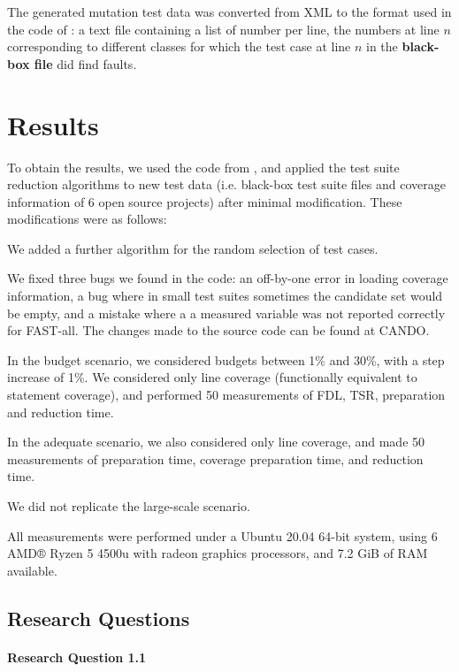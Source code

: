 The generated mutation test data was converted from XML to the format used
in the code of \cite{cruciani2019scalable}: a text file containing a list
of number per line, the numbers at line $n$ corresponding to different
classes for which the test case at line $n$ in the \textbf{black-box file}
did find faults.

\section{Results}

To obtain the results, we used the code from \cite{cruciani2019scalable},
and applied the test suite reduction algorithms to new test data
(i.e. black-box test suite files and coverage information of 6 open source
projects) after minimal modification. These modifications were as follows:

We added a further algorithm for the random selection of test cases.

We fixed three bugs we found in the code: an off-by-one error in loading
coverage information, a bug where in small test suites sometimes the
candidate set would be empty, and a mistake where a a measured variable
was not reported correctly for FAST-all. The changes made to the source
code can be found at CANDO.

In the budget scenario, we considered budgets between 1\% and 30\%, with
a step increase of 1\%. We considered only line coverage (functionally
equivalent to statement coverage), and performed 50 measurements of
FDL, TSR, preparation and reduction time.

In the adequate scenario, we also considered only line coverage, and
made 50 measurements of preparation time, coverage preparation time,
and reduction time.

We did not replicate the large-scale scenario.

All measurements were performed under a Ubuntu 20.04 64-bit system,
using 6 AMD® Ryzen 5 4500u with radeon graphics processors, and 7.2
GiB of RAM available.

\subsection{Research Questions}

\paragraph{Research Question 1.1}

